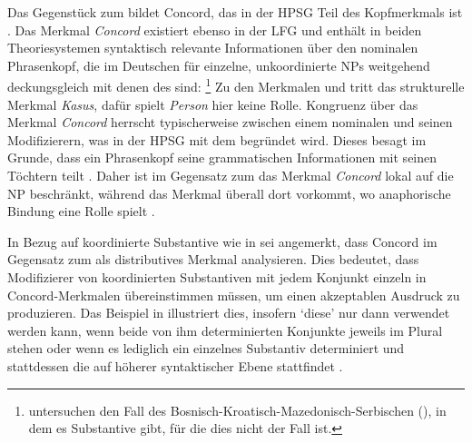 \begin{exe}
\ex\label{ex:coordidx}
\begin{xlist}
\end{xlist}
\end{exe}


\label{phsec:concord}

Das Gegenstück zum  bildet Concord, das in der HPSG Teil des Kopfmerkmals ist
\autocite[17]{wechslerzlatic2003}. Das Merkmal \emph{Concord} existiert ebenso
in der LFG \autocite[189--192]{bresnanetal2016}
und enthält in beiden Theoriesystemen syntaktisch relevante Informationen über
den nominalen Phrasenkopf, die im Deutschen für
einzelne, unkoordinierte NPs weitgehend deckungsgleich mit
denen des  sind:%
%
	\footnote{\citet{wechslerzlatic2003} untersuchen den Fall des
	Bosnisch-Kroatisch-Mazedonisch-Serbischen (), in dem es
	Substantive gibt, für die dies nicht der Fall ist.}
%
Zu den Merkmalen \emph{} und \emph{} tritt das
strukturelle Merkmal \emph{Kasus}, dafür spielt \emph{Person} hier keine Rolle.
Kongruenz über das Merkmal \emph{Concord} herrscht typischerweise zwischen
einem nominalen  und seinen Modifizierern, was in der
HPSG mit dem  begründet wird. Dieses besagt im Grunde, dass ein
Phrasenkopf seine grammatischen Informationen mit seinen Töchtern
teilt \autocites[vgl.][34]{pollardsag1994}[22]{wechslerzlatic2003}. Daher ist
im Gegensatz zum  das Merkmal \emph{Concord} lokal auf die
NP beschränkt, während das Merkmal \emph{} überall
dort vorkommt, wo anaphorische Bindung eine Rolle
spielt \parencites[14--16, 22]{wechslerzlatic2003}[189]{bresnanetal2016}.

In Bezug auf koordinierte Substantive wie in
 sei angemerkt, dass \citet[76--78]{kingdalrymple2004} Concord
im Gegensatz zum  als distributives Merkmal analysieren. Dies
bedeutet, dass Modifizierer von koordinierten Substantiven mit jedem Konjunkt
einzeln in Concord-Merkmalen übereinstimmen müssen, um einen akzeptablen
Ausdruck zu produzieren. Das Beispiel in  illustriert
dies, insofern  `diese' nur dann verwendet werden kann, wenn beide
von ihm determinierten Konjunkte jeweils im Plural stehen
 oder wenn es lediglich ein einzelnes Substantiv
determiniert und stattdessen die  auf höherer syntaktischer
Ebene stattfindet .

